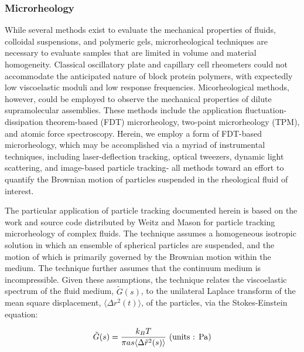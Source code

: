 \begin{refsection}
\subsubsection{Microrheology}
While several methods exist to evaluate the mechanical properties of fluids,
colloidal suspensions, and polymeric gels, microrheological techniques are
necessary to evaluate samples that are limited in volume and material
homogeneity. Classical oscillatory plate and capillary cell rheometers could not
accommodate the anticipated nature of block protein polymers, with expectedly
low viscoelastic moduli and low response frequencies. Micorheological methods,
however, could be employed to observe the mechanical properties of dilute
supramolecular assemblies. These methods include the application
fluctuation-dissipation theorem-based (FDT)
microrheology,\cite{Gittes1997,Mason1997,Mason1997a} two-point microrheology
(TPM),\cite{Crocker2000,Levine2000,Qiu2004,Levine2001} and atomic force
spectroscopy.\cite{Salman2002,Caspi2002} Herein, we employ a form of FDT-based
microrheology, which may be accomplished via a myriad of instrumental
techniques, including laser-deflection tracking,\cite{Gittes1997,Mason1997}
optical tweezers,\cite{Starrs2003,Addas2004} dynamic light
scattering,\cite{Dasgupta2002,Popescu2002} and image-based particle
tracking\cite{Valentine2004,Crocker2000,Chen2003}- all methods toward an effort
to quantify the Brownian motion of particles suspended in the rheological fluid
of interest.

The particular application of particle tracking documented herein is based on
the work and source code distributed by Weitz and Mason for particle tracking
microrheology of complex fluids.\cite{Mason1997} The technique assumes a
homogeneous isotropic solution in which an ensemble of spherical particles are
suspended, and the motion of which is primarily governed by the Brownian motion
within the medium.  The technique further assumes that the continuum medium is
incompressible. Given these assumptions, the technique relates the viscoelastic
spectrum of the fluid medium, ${\tilde{G}(s)}$, to the unilateral Laplace
transform of the mean square displacement, ${\langle \Delta r^2(t) \rangle}$, of
the particles, via the Stokes-Einstein equation:

\begin{equation}
    \label{eq:stokes-einstein}
    \tilde{G}(s)=
    \frac{k_BT}{\pi a s \langle \Delta \tilde{r}^2(s) \rangle}
    \text{ (units : \si{\pascal})}
\end{equation}


\end{refsection}
